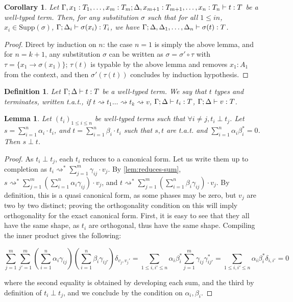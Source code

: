 \documentclass[10pt,a4paper]{article}
\newcommand{\vartyping}[2]{#1 : #2}
\newcommand{\typing}[4]{
  \ifx&#1&\varnothing \else #1\fi; 
  \ifx&#2&\varnothing \else #2\fi 
  \vdash {#3} : #4
}
\newcommand\kron[2]{\delta_{#1, #2}}
\newcommand{\subarrow}{\to}
\newcommand{\subsupp}[1]{\mathrm{Supp}(#1)}
\newcommand{\reduces}{\rightsquigarrow}
\newcommand{\sreduces}{\reduces^*}
\newtheorem{lemma}[theorem]{Lemma}
\newtheorem{corollary}[theorem]{Corollary}
\newtheorem{definition}[theorem]{Definition}
\begin{document}
\begin{corollary}\label{lem:substitutionlemma}
  Let $\typing {\Gamma, \vartyping{x_1}{T_1}, \dots,
  \vartyping{x_m}{T_m}}{\Delta, \vartyping{x_{m+1}}{T_{m+1}}, \dots,
  \vartyping{x_n}{T_n}} t T$ be a well-typed term.
  Then, for any substitution $\sigma$ such that for all $1 \leq i n$,
  $x_i \in \subsupp \sigma$, $\typing \Gamma {\Delta_i} {\sigma(x_i)}
  {T_i}$, we have $\typing \Gamma {\Delta, \Delta_1, \dots, \Delta_n}
  {\sigma(t)} T$.
\end{corollary}

\begin{proof}
  Direct by induction on $n$: the case $n = 1$ is simply the above
  lemma, and for $n=k+1$, any substitution $\sigma$ can be written as
  $\sigma= \sigma' \circ \tau$ with $\tau = \{x_1 \subarrow
  \sigma(x_1)\}$; $\tau(t)$ is typable by the above lemma and removes
  $\vartyping {x_1} A_1$ from the context, and then
  $\sigma'(\tau(t))$ concludes by induction hypothesis. \qedhere
\end{proof}

\begin{definition}
  Let $\typing \Gamma \Delta t T$ be a well-typed term.
  We say that $t$ types and terminates, written t.a.t.,
  if $t \reduces t_1 \dots \reduces t_k \reduces v$,
  $\typing \Gamma \Delta {t_i} T$,
  $\typing \Gamma \Delta v T$.
\end{definition}

\begin{lemma}\label{lem:ortho-sum}
  Let $(t_i)_{1 \leq i \leq n}$ be well-typed terms
  such that $\forall i \neq j, t_i \perp t_j$.
  Let $s = \sum_{i=1}^n \alpha_i \cdot t_i$,
  and $t = \sum_{i=1}^n \beta_i \cdot t_i$
  such that $s, t$ are t.a.t. and $\sum_{i=1}^n \alpha_i \beta_i^* = 0$.
  Then $s \perp t$.
\end{lemma}

\begin{proof}
  As $t_i \perp t_j$, each $t_i$ reduces to a canonical form.
  Let us write them up to completion as
  $t_i \sreduces \sum_{j=1}^m \gamma_{ij} \cdot v_j$.
  By \autoref{lem:reduces-sum},
  $s \sreduces \sum_{j=1}^m
  (\sum_{i=1}^n \alpha_i \gamma_{ij}) \cdot v_j$, and
  $t \sreduces \sum_{j=1}^m
  (\sum_{i=1}^n \beta_i \gamma_{ij}) \cdot v_j$.
  By definition, this is a quasi canonical form, as some phases may be zero, but
  $v_j$ are two by two distinct; proving the orthogonality condition
  on this will imply
  orthogonality for the exact canonical form.
  First, it is easy to see that they all have the same shape,
  as $t_i$ are orthogonal, thus have the same shape.
  Compiling the inner product gives the following:

  \[
    \sum_{j=1}^m \sum_{j'=1}^m (\sum_{i=1}^n \alpha_i
    \gamma_{ij})(\sum_{i=1}^n \beta_i \gamma_{ij'}) \kron{v_j}{v_j'}
    = \sum_{1 \leq i,i' \leq n} \alpha_i \beta_i^* \sum_{j=1}^m
    \gamma_{ij} \gamma_{ij'}^*
    = \sum_{1 \leq i,i' \leq n} \alpha_i \beta_i^*  \kron{i}{i'} = 0
  \]

  where the second equality is obtained by developing each sum, and the third
  by definition of $t_i \perp t_j$, and we conclude by the condition
  on $\alpha_i, \beta_i$. \qedhere
\end{proof}
\end{document}
